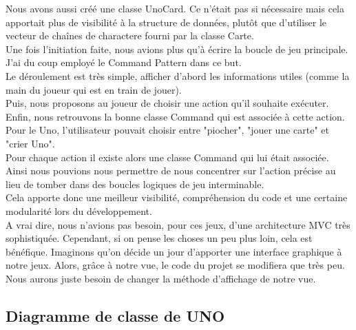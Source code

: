 \documentclass[12pt, letterpaper]{article}
\begin{document}
Nous avons aussi créé une classe UnoCard. Ce n’était pas si nécessaire mais cela apportait plus de visibilité à la structure de données,
plutôt que d’utiliser le vecteur de chaînes de charactere fourni par la classe Carte.\\
Une fois l’initiation faite, nous avions plus qu’à écrire la boucle de jeu principale. J’ai du coup employé le Command Pattern dans ce but.\\
Le déroulement est très simple, afficher d’abord les informations utiles (comme la main du joueur qui est en train de jouer).\\
Puis, nous proposons au joueur de choisir une action qu’il souhaite exécuter.\\
Enfin, nous retrouvons la bonne classe Command qui est associée à cette action.\\
Pour le Uno, l’utilisateur pouvait choisir entre "piocher", "jouer une carte" et "crier Uno".\\
Pour chaque action il existe alors une classe Command qui lui était associée.\\
Ainsi nous pouvions nous permettre de nous concentrer sur l’action précise au lieu de tomber dans des boucles logiques de jeu interminable.\\
Cela apporte donc une meilleur visibilité, compréhension du code et une certaine modularité lors du développement.\\

A vrai dire, nous n’avions pas besoin, pour ces jeux, d’une architecture MVC très sophistiquée. Cependant, si on pense les choses un peu plus loin, cela est bénéfique. 
Imaginons qu’on décide un jour d’apporter une interface graphique à notre jeux. Alors, grâce à notre vue, le code du projet se modifiera que très peu. 
Nous aurons juste besoin de changer la méthode d'affichage de notre vue.\\

\subsection{Diagramme de classe de UNO}
\end{document}
